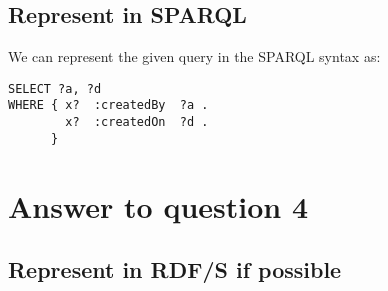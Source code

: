 \documentclass[a4paper,12pt]{article}
\begin{document}
\subsection[SPARQL]{Represent in SPARQL}
We can represent the given query in the SPARQL syntax as:
\begin{Verbatim}[samepage=true]
SELECT ?a, ?d
WHERE { x?  :createdBy  ?a .
        x?  :createdOn  ?d .
      }
\end{Verbatim}

\section[Question 4]{Answer to question 4}

\subsection[RDF/S representation]{Represent in RDF/S if possible}
\end{document}
